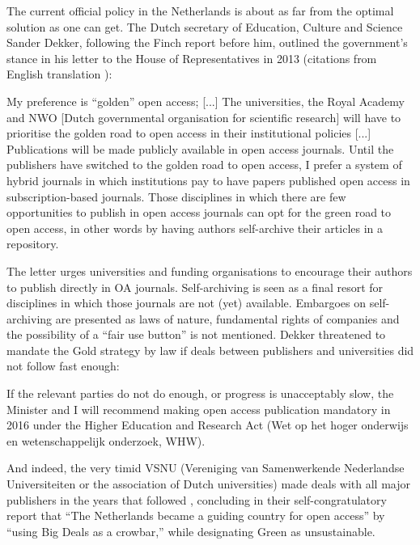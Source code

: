 \documentclass[11pt, openany, oneside, article, a4paper, twocolumn]{memoir}
\begin{document}
The current official policy in the Netherlands is about as far from the optimal
solution as one can get. The Dutch secretary of Education, Culture and Science
Sander Dekker, following the Finch report \cite{finch2012accessibility} before
him, outlined the government's stance in his letter to the House of
Representatives \cite{dekker_kamerbrief} in 2013 (citations from English
translation \cite{dekker_kamerbrief_english}):
\begin{displayquote}
\begin{small}
  My preference is “golden” open access; [...] The universities, the Royal
  Academy and NWO [Dutch governmental organisation for scientific
  research] will have to prioritise the golden road to open access in their
  institutional policies [...] Publications will be made publicly available in
  open access journals. Until the publishers have switched to the golden road
  to open access, I prefer a system of hybrid journals in which institutions
  pay to have papers published open access in subscription-based journals.
  Those disciplines in which there are few opportunities to publish in open
  access journals can opt for the green road to open access, in other words by
  having authors self-archive their articles in a repository.
\end{small}
\end{displayquote}

The letter urges universities and funding organisations to encourage their
authors to publish directly in OA journals. Self-archiving is seen as
a final resort for disciplines in which those journals are not (yet)
available. Embargoes on self-archiving are presented as laws of nature, fundamental rights
of companies and the
possibility of a \enquote{fair use button} is not mentioned.
Dekker threatened to mandate the
Gold strategy by law if deals between publishers and universities did not follow
fast enough:
\begin{displayquote}
\begin{small}
If the relevant parties do not do enough, or progress is unacceptably slow, the
Minister and I will recommend making open access publication mandatory in 2016
under the Higher Education and Research Act (Wet op het hoger onderwijs en
wetenschappelijk onderzoek, WHW).
\end{small}
\end{displayquote}

And indeed, the very timid VSNU (Vereniging van Samenwerkende Nederlandse
Universiteiten or the association of Dutch universities) made deals with
all major publishers in the years that followed \cite{timeline_oa},
concluding in their self-congratulatory report \cite{ezine_oa} that \enquote{The Netherlands became a guiding country for open
access} by \enquote{using Big Deals as a crowbar,} while designating Green as unsustainable.
\end{document}
